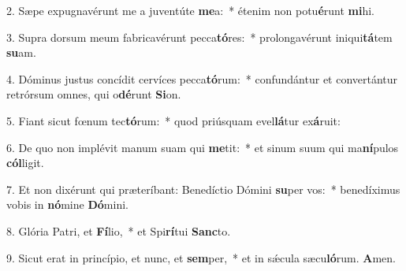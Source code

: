 2. Sæpe expugnavérunt me a juventúte \textbf{me}a:~*  étenim non potu\textbf{é}runt \textbf{mi}hi.\

3. Supra dorsum meum fabricavérunt pecca\textbf{tó}res:~*  prolongavérunt iniqui\textbf{tá}tem \textbf{su}am.\

4. Dóminus justus concídit cervíces pecca\textbf{tó}rum:~*  confundántur et convertántur retrórsum omnes, qui o\textbf{dé}runt \textbf{Si}on.\

5. Fiant sicut fœnum tec\textbf{tó}rum:~*  quod priúsquam evel\textbf{lá}tur ex\textbf{á}ruit:\

6. De quo non implévit manum suam qui \textbf{me}tit:~*  et sinum suum qui ma\textbf{ní}pulos \textbf{cól}ligit.\

7. Et non dixérunt qui præteríbant: Benedíctio Dómini \textbf{su}per vos:~*  benedíximus vobis in \textbf{nó}mine \textbf{Dó}mini.\

8. Glória Patri, et \textbf{Fí}lio,~*  et Spi\textbf{rí}tui \textbf{Sanc}to.\

9. Sicut erat in princípio, et nunc, et \textbf{sem}per,~*  et in sǽcula sæcu\textbf{ló}rum. \textbf{A}men.\

